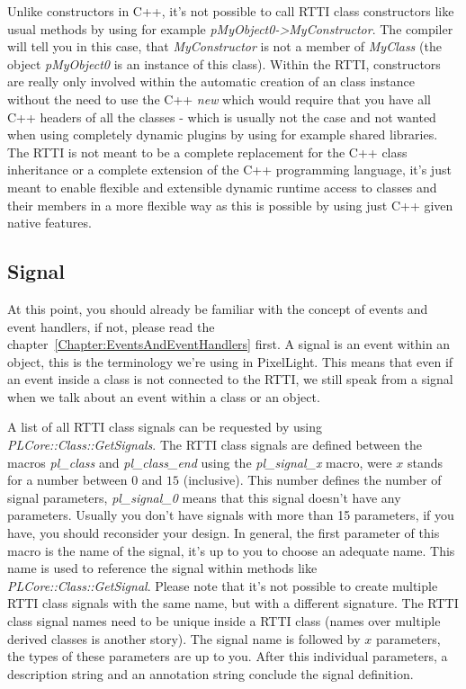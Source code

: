 Unlike constructors in C++, it's not possible to call RTTI class constructors like usual methods by using for example \emph{pMyObject0->MyConstructor}. The compiler will tell you in this case, that \emph{MyConstructor} is not a member of \emph{MyClass} (the object \emph{pMyObject0} is an instance of this class). Within the RTTI, constructors are really only involved within the automatic creation of an class instance without the need to use the C++ \emph{new} which would require that you have all C++ headers of all the classes - which is usually not the case and not wanted when using completely dynamic plugins by using for example shared libraries. The RTTI is not meant to be a complete replacement for the C++ class inheritance or a complete extension of the C++ programming language, it's just meant to enable flexible and extensible dynamic runtime access to classes and their members in a more flexible way as this is possible by using just C++ given native features.



\subsection{Signal}
At this point, you should already be familiar with the concept of events and event handlers, if not, please read the chapter~\ref{Chapter:EventsAndEventHandlers} first. A signal is an event within an object, this is the terminology we're using in PixelLight. This means that even if an event inside a class is not connected to the RTTI, we still speak from a signal when we talk about an event within a class or an object.

A list of all RTTI class signals can be requested by using \emph{PLCore::Class::GetSignals}. The RTTI class signals are defined between the macros \emph{pl\_class} and \emph{pl\_class\_end} using the \emph{pl\_signal\_x} macro, were $x$ stands for a number between $0$ and $15$ (inclusive). This number defines the number of signal parameters, \emph{pl\_signal\_0} means that this signal doesn't have any parameters. Usually you don't have signals with more than 15 parameters, if you have, you should reconsider your design. In general, the first parameter of this macro is the name of the signal, it's up to you to choose an adequate name. This name is used to reference the signal within methods like \emph{PLCore::Class::GetSignal}. Please note that it's not possible to create multiple RTTI class signals with the same name, but with a different signature. The RTTI class signal names need to be unique inside a RTTI class (names over multiple derived classes is another story). The signal name is followed by $x$ parameters, the types of these parameters are up to you. After this individual parameters, a description string and an annotation string conclude the signal definition.

